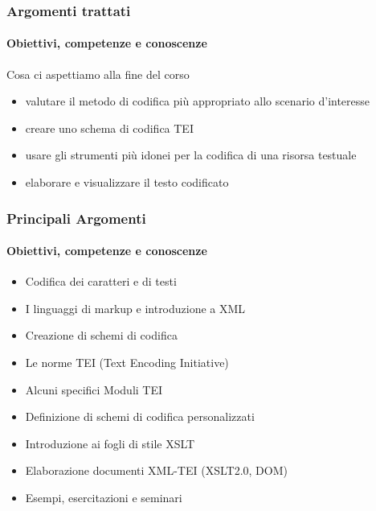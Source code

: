 \begin{frame}
    \frametitle{Argomenti trattati}
    \framesubtitle{Obiettivi, competenze e conoscenze}
    \addtocounter{nframe}{1}
    
    \begin{block}{Cosa ci aspettiamo alla fine del corso}
        \begin{itemize}
        \item valutare il metodo di codifica più appropriato allo scenario d'interesse
        \item creare uno schema di codifica TEI
        \item usare gli strumenti più idonei per la codifica di una risorsa testuale
        \item elaborare e visualizzare il testo codificato
        \end{itemize}
    \end{block}

\end{frame}

\begin{frame}
    \frametitle{Principali Argomenti}
    \framesubtitle{Obiettivi, competenze e conoscenze}
    \addtocounter{nframe}{1}

    
        \begin{itemize}
            \item Codifica dei caratteri e di testi
            \item I linguaggi di markup e introduzione a XML
            \item Creazione di schemi di codifica
            \item Le norme TEI (Text Encoding Initiative)
            \item Alcuni specifici Moduli TEI
            \item Definizione di schemi di codifica personalizzati
            \item Introduzione ai fogli di stile XSLT
            \item Elaborazione documenti XML-TEI (XSLT2.0, DOM)
            \item Esempi, esercitazioni e seminari 
        \end{itemize}

\end{frame}

